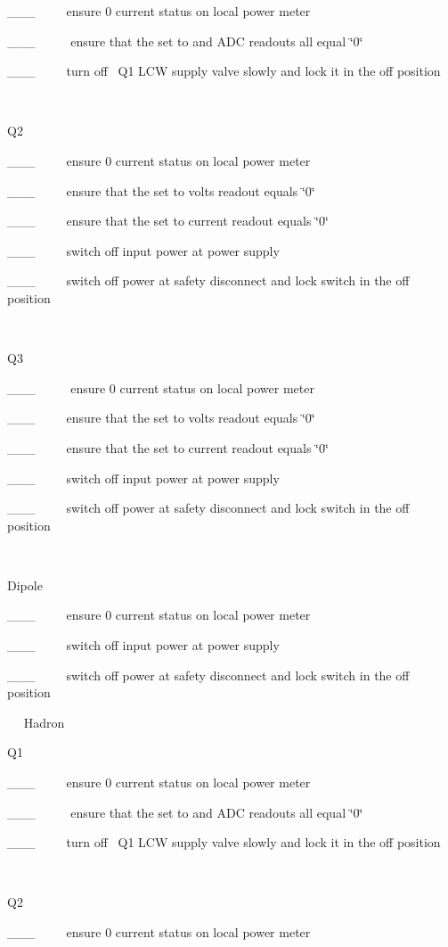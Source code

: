 \_\_\_~~~~~ensure 0 current status on local power meter 

\_\_\_~~~~~ ensure that the set to and ADC readouts all equal \char`\"{}0\char`\"{} 

\_\_\_~~~~~turn off~ Q1 LCW supply valve slowly and lock it in the off position

~

Q2

\_\_\_~~~~~ensure 0 current status on local power meter 

\_\_\_~~~~~ensure that the set to volts readout equals \char`\"{}0\char`\"{}

\_\_\_~~~~~ensure that the set to current readout equals \char`\"{}0\char`\"{}

\_\_\_~~~~~switch off input power at power supply

\_\_\_~~~~~switch off power at safety disconnect and lock switch in the off
position

~

Q3

\_\_\_~~~~~ ensure 0 current status on local power meter 

\_\_\_~~~~~ensure that the set to volts readout equals \char`\"{}0\char`\"{}

\_\_\_~~~~~ensure that the set to current readout equals \char`\"{}0\char`\"{}

\_\_\_~~~~~switch off input power at power supply

\_\_\_~~~~~switch off power at safety disconnect and lock switch in the off
position

~

Dipole

\_\_\_~~~~~ensure 0 current status on local power meter 

\_\_\_~~~~~switch off input power at power supply

\_\_\_~~~~~switch off power at safety disconnect and lock switch in the off
position

~~
Hadron

Q1

\_\_\_~~~~~ensure 0 current status on local power meter 

\_\_\_~~~~~ ensure that the set to and ADC readouts all equal \char`\"{}0\char`\"{} 

\_\_\_~~~~~turn off~ Q1 LCW supply valve slowly and lock it in the off position

~

Q2

\_\_\_~~~~~ensure 0 current status on local power meter 

